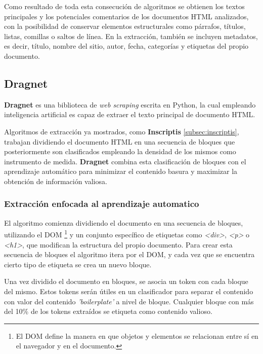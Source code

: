 Como resultado de toda esta consecución de algoritmos se obtienen los textos principales y los potenciales
comentarios de los documentos HTML analizados, con la posibilidad de conservar elementos estructurales como
párrafos, títulos, listas, comillas o saltos de línea. En la extracción, también se incluyen metadatos, 
es decir, título, nombre del sitio, autor, fecha, categorías y etiquetas del propio documento.

\subsection{Dragnet}
\label{subsec:dragnet}

\textbf{Dragnet} \cite{dragnet} es una biblioteca de \emph{web scraping} escrita en Python, la cual empleando 
inteligencia artificial es capaz de extraer el texto principal de documento HTML.

Algoritmos de extracción ya mostrados, como \textbf{Inscriptis} \ref{subsec:inscriptis}, trabajan dividiendo 
el documento HTML en una secuencia de bloques que posteriormente son clasificados empleando la densidad de 
los mismos como instrumento de medida. \textbf{Dragnet} combina esta clasificación de bloques con el 
aprendizaje automático para minimizar el contenido basura y maximizar la obtención de información valiosa.

\subsubsection{Extracción enfocada al aprendizaje automatico}
\label{subsubsec:extraccion enfocada al aprendizaje automatico}

El algoritmo comienza dividiendo el documento en una secuencia de bloques, utilizando el DOM \footnote{El 
DOM define la manera en que objetos y elementos se relacionan entre sí en el navegador y en el documento.} 
y un conjunto específico de etiquetas como \emph{<div>}, \emph{<p>} o \emph{<h1>}, que modifican la 
estructura del propio documento. Para crear esta secuencia de bloques el algoritmo itera por el DOM, y cada 
vez que se encuentra cierto tipo de etiqueta se crea un nuevo bloque.

Una vez dividido el documento en bloques, se asocia un token con cada bloque del mismo. Estos tokens serán 
útiles en un clasificador para separar el contenido con valor del contenido \emph{'boilerplate'} a nivel 
de bloque. Cualquier bloque con más del 10\% de los tokens extraídos se etiqueta como contenido valioso.


